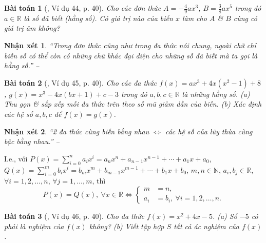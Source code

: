 \documentclass{article}
\numberwithin{equation}{section}
\newtheorem{baitoan}{Bài toán}
\newtheorem{nhanxet}{Nhận xét}[section]
\begin{document}
\begin{baitoan}[\cite{Tuyen_Toan_7}, Ví dụ 44, p. 40]
	Cho các đơn thức $A = -\frac{4}{9}ax^3$, $B = \frac{3}{8}ax^5$ trong đó $a\in\mathbb{R}$ là số đã biết (hằng số). Có giá trị nào của biến $x$ làm cho $A$ \& $B$ cùng có giá trị âm không?
\end{baitoan}

\begin{nhanxet}
	``Trong đơn thức cũng như trong đa thức nói chung, ngoài chữ chỉ biến số có thể còn có những chữ khác đại diện cho những số đã biết mà ta gọi là \emph{hằng số}.'' -- \cite[p. 40]{Tuyen_Toan_7}
\end{nhanxet}

\begin{baitoan}[\cite{Tuyen_Toan_7}, Ví dụ 45, p. 40]
	Cho các đa thức $f(x) = ax^3 + 4x(x^2 - 1) + 8$, $g(x) = x^3 - 4x(bx + 1) + c - 3$ trong đó $a,b,c\in\mathbb{R}$ là những hằng số. (a) Thu gọn \& sắp xếp mỗi đa  thức trên theo số mũ giảm dần của biến. (b) Xác định các hệ số $a,b,c$ để $f(x) = g(x)$.
\end{baitoan}

\begin{nhanxet}
	``2 đa thức cùng biến bằng nhau $\Leftrightarrow$ các hệ số của lũy thừa cùng bậc bằng nhau.'' -- \cite[p. 40]{Tuyen_Toan_7}
\end{nhanxet}
I.e., với $P(x) = \sum_{i=0}^n a_ix^i = a_nx^n + a_{n-1}x^{n-1} + \cdots + a_1x + a_0$, $Q(x) = \sum_{i=0}^m b_ix^i = b_mx^m + b_{m-1}x^{m-1} + \cdots + b_1x + b_0$, $m,n\in\mathbb{N}$, $a_i,b_j\in\mathbb{R}$, $\forall i = 1,2,\ldots,n$, $\forall j = 1,\ldots,m$, thì
\begin{equation*}
	P(x) = Q(x),\ \forall x\in\mathbb{R}\Leftrightarrow\left\{\begin{split}
		m &= n,\\
		a_i &= b_i,\ \forall i = 1,2,\ldots,n.
	\end{split}\right.
\end{equation*}

\begin{baitoan}[\cite{Tuyen_Toan_7}, Ví dụ 46, p. 40]
	Cho đa thức $f(x) = x^2 + 4x - 5$. (a) Số $-5$ có phải là nghiệm của $f(x)$ không? (b) Viết tập hợp $S$ tất cả ác nghiệm của $f(x)$.
\end{baitoan}
\end{document}
